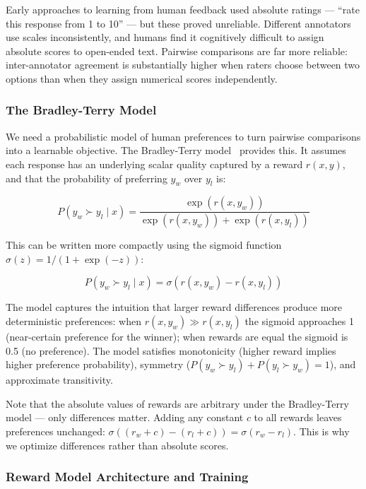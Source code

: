 \documentclass{book}
\begin{document}
Early approaches to learning from human feedback used absolute ratings ---
``rate this response from 1 to 10'' --- but these proved unreliable.
Different annotators use scales inconsistently, and humans find it
cognitively difficult to assign absolute scores to open-ended text.
Pairwise comparisons are far more reliable: inter-annotator agreement
is substantially higher when raters choose between two options than when
they assign numerical scores independently.

\subsubsection{The Bradley-Terry Model}
\label{sec:bradley_terry}

We need a probabilistic model of human preferences to turn pairwise
comparisons into a learnable objective. The Bradley-Terry
model~\cite{bradley1952rank} provides this. It assumes each response has
an underlying scalar quality captured by a reward $r(x, y)$, and that the
probability of preferring $y_w$ over $y_l$ is:

\begin{equation}
\label{eq:bradley_terry}
P(y_w \succ y_l \mid x)
= \frac{\exp(r(x, y_w))}{\exp(r(x, y_w)) + \exp(r(x, y_l))}
\end{equation}

This can be written more compactly using the sigmoid function
$\sigma(z) = 1 / (1 + \exp(-z))$:

\begin{equation}
\label{eq:bradley_terry_sigmoid}
P(y_w \succ y_l \mid x) = \sigma(r(x, y_w) - r(x, y_l))
\end{equation}

The model captures the intuition that larger reward differences produce
more deterministic preferences: when $r(x, y_w) \gg r(x, y_l)$ the
sigmoid approaches 1 (near-certain preference for the winner); when
rewards are equal the sigmoid is 0.5 (no preference). The model satisfies
monotonicity (higher reward implies higher preference probability),
symmetry ($P(y_w \succ y_l) + P(y_l \succ y_w) = 1$), and approximate
transitivity.

Note that the absolute values of rewards are arbitrary under the
Bradley-Terry model --- only differences matter. Adding any constant $c$
to all rewards leaves preferences unchanged:
$\sigma((r_w + c) - (r_l + c)) = \sigma(r_w - r_l)$. This is why we
optimize differences rather than absolute scores.

\subsubsection{Reward Model Architecture and Training}
\label{sec:rm_architecture}
\end{document}
